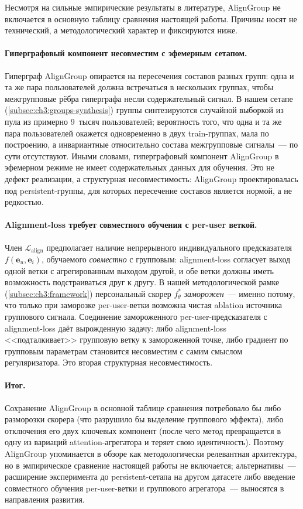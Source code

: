 Несмотря на сильные эмпирические результаты в литературе, AlignGroup не включается в основную таблицу сравнения настоящей работы. Причины носят не технический, а методологический характер и фиксируются ниже.

\paragraph{Гиперграфовый компонент несовместим с эфемерным сетапом.} Гиперграф AlignGroup опирается на пересечения составов разных групп: одна и та же пара пользователей должна встречаться в нескольких группах, чтобы межгрупповые рёбра гиперграфа несли содержательный сигнал. В нашем сетапе (\ref{subsec:ch3:groups-synthesis}) группы синтезируются случайной выборкой из пула из примерно 9~тысяч пользователей; вероятность того, что одна и та же пара пользователей окажется одновременно в двух train-группах, мала по построению, а инвариантные относительно состава межгрупповые сигналы~--- по сути отсутствуют. Иными словами, гиперграфовый компонент AlignGroup в эфемерном режиме не имеет содержательных данных для обучения. Это не дефект реализации, а структурная несовместимость: AlignGroup проектировалась под persistent-группы, для которых пересечение составов является нормой, а не редкостью.

\paragraph{Alignment-loss требует совместного обучения с per-user веткой.} Член $\mathcal{L}_{\mathrm{align}}$ предполагает наличие непрерывного индивидуального предсказателя $f(\mathbf{e}_u, \mathbf{e}_i)$, обучаемого \emph{совместно} с групповым: alignment-loss согласует выход одной ветки с агрегированным выходом другой, и обе ветки должны иметь возможность подстраиваться друг к другу. В нашей методологической рамке (\ref{subsec:ch3:framework}) персональный скорер $f_\theta^\ast$ \emph{заморожен}~--- именно потому, что только при заморозке per-user-ветки возможна чистая ablation источника группового сигнала. Соединение замороженного per-user-предсказателя с alignment-loss даёт вырожденную задачу: либо alignment-loss <<подталкивает>> групповую ветку к замороженной точке, либо градиент по групповым параметрам становится несовместим с самим смыслом регуляризатора. Это вторая структурная несовместимость.

\paragraph{Итог.} Сохранение AlignGroup в основной таблице сравнения потребовало бы либо разморозки скорера (что разрушило бы выделение группового эффекта), либо отключения его двух ключевых компонент (после чего метод превращается в одну из вариаций attention-агрегатора и теряет свою идентичность). Поэтому AlignGroup упоминается в обзоре как методологически релевантная архитектура, но в эмпирическое сравнение настоящей работы не включается; альтернативы~--- расширение эксперимента до persistent-сетапа на другом датасете либо введение совместного обучения per-user-ветки и группового агрегатора~--- выносятся в направления развития.


